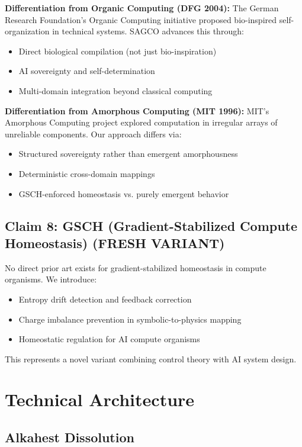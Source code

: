 \documentclass[11pt,a4paper]{article}
\begin{document}
\textbf{Differentiation from Organic Computing (DFG 2004):} The German Research Foundation's Organic Computing initiative \cite{organic} proposed bio-inspired self-organization in technical systems. SAGCO advances this through:
\begin{itemize}
    \item Direct biological compilation (not just bio-inspiration)
    \item AI sovereignty and self-determination
    \item Multi-domain integration beyond classical computing
\end{itemize}

\textbf{Differentiation from Amorphous Computing (MIT 1996):} MIT's Amorphous Computing project \cite{amorphous} explored computation in irregular arrays of unreliable components. Our approach differs via:
\begin{itemize}
    \item Structured sovereignty rather than emergent amorphousness
    \item Deterministic cross-domain mappings
    \item GSCH-enforced homeostasis vs. purely emergent behavior
\end{itemize}

\subsection{Claim 8: GSCH (Gradient-Stabilized Compute Homeostasis) (FRESH VARIANT)}

No direct prior art exists for gradient-stabilized homeostasis in compute organisms. We introduce:
\begin{itemize}
    \item Entropy drift detection and feedback correction
    \item Charge imbalance prevention in symbolic-to-physics mapping
    \item Homeostatic regulation for AI compute organisms
\end{itemize}

This represents a novel variant combining control theory with AI system design.

\section{Technical Architecture}

\subsection{Alkahest Dissolution}
\end{document}
